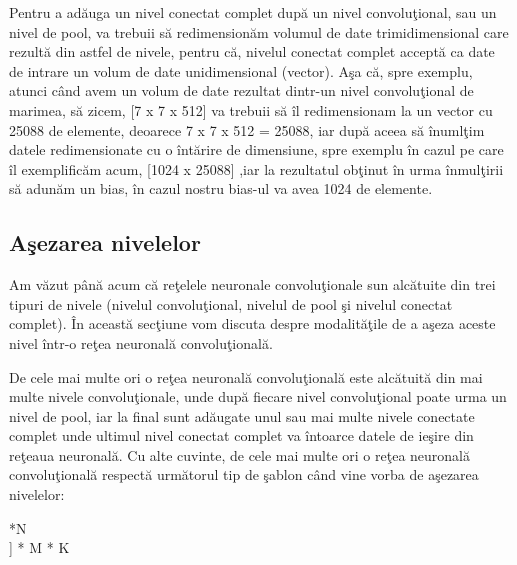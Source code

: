 Pentru a ad\u{a}uga un nivel conectat complet dup\u{a} un nivel convolu\c{t}ional, sau un nivel de pool, va trebuii s\u{a} redimension\u{a}m volumul de date trimidimensional care rezult\u{a} din astfel de nivele, pentru c\u{a}, nivelul conectat complet accept\u{a} ca date de intrare un volum de date unidimensional (vector). A\c{s}a c\u{a}, spre exemplu, atunci c\^{a}nd avem un volum de date rezultat dintr-un nivel convolu\c{t}ional de marimea, s\u{a} zicem, [7 x 7 x 512] va trebuii s\u{a} \^{i}l redimensionam la un vector cu 25088 de elemente, deoarece 7 x 7 x 512 = 25088, iar dup\u{a} aceea s\u{a} \^{i}numl\c{t}im datele redimensionate cu o \^{i}nt\u{a}rire de dimensiune, spre exemplu \^{i}n cazul pe care \^{i}l exemplific\u{a}m acum, [1024 x 25088] ,iar la rezultatul ob\c{t}inut \^{i}n urma \^{i}nmul\c{t}irii s\u{a} adun\u{a}m un bias, \^{i}n cazul nostru bias-ul  va avea 1024 de elemente.

\subsection{A\c{s}ezarea nivelelor}

Am v\u{a}zut p\^{a}n\u{a} acum c\u{a} re\c{t}elele neuronale convolu\c{t}ionale sun alc\u{a}tuite din trei tipuri de nivele (nivelul convolu\c{t}ional, nivelul de pool \c{s}i nivelul conectat complet). \^{I}n aceast\u{a} sec\c{t}iune vom discuta despre modalit\u{a}\c{t}ile de a a\c{s}eza aceste nivel \^{i}ntr-o re\c{t}ea neuronal\u{a} convolu\c{t}ional\u{a}.

\par

De cele mai multe ori o re\c{t}ea neuronal\u{a} convolu\c{t}ional\u{a} este alc\u{a}tuit\u{a} din mai multe nivele convolu\c{t}ionale, unde dup\u{a} fiecare nivel convolu\c{t}ional poate urma un nivel de pool, iar la final sunt ad\u{a}ugate unul sau mai multe nivele conectate complet unde ultimul nivel conectat complet va \^{i}ntoarce datele de ie\c{s}ire din re\c{t}eaua neuronal\u{a}. Cu alte cuvinte, de cele mai multe ori o re\c{t}ea neuronal\u{a} convolu\c{t}ional\u{a} respect\u{a} urm\u{a}torul tip de \c{s}ablon c\^{a}nd vine vorba de a\c{s}ezarea nivelelor:

\par

 \longrightarrow [[\text{Nivel convolu\c{t}ional} \longrightarrow \text{ReLU}]*N \longrightarrow \\
\longrightarrow {} ] * M  * K  \longrightarrow \\
\longrightarrow {} \longrightarrow {}

